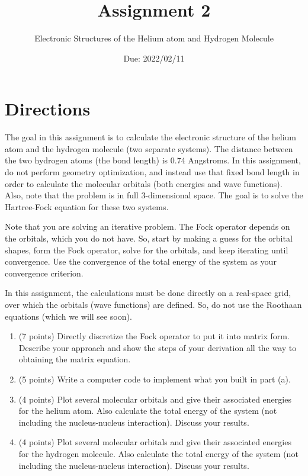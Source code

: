 \documentclass[10pt, oneside, letterpaper]{article}
\title{Assignment 2}
\author{Electronic Structures of the Helium atom and Hydrogen Molecule}
\date{Due: 2022/02/11}
\begin{document}
\maketitle
\thispagestyle{fancy}

\section{Directions}

The goal in this assignment is to calculate the electronic structure of the helium atom and the hydrogen molecule (two separate systems). The distance between the two hydrogen atoms (the bond length) is 0.74 Angstroms. In this assignment, do not perform geometry optimization, and instead use that fixed bond length in order to calculate the molecular orbitals (both energies and wave functions). Also, note that the problem is in full 3-dimensional space. The goal is to solve the Hartree-Fock equation for these two systems.

Note that you are solving an iterative problem. The Fock operator depends on the orbitals, which you do not have. So, start by making a guess for the orbital shapes, form the Fock operator, solve for the orbitals, and keep iterating until convergence. Use the convergence of the total energy of the system as your convergence criterion.

In this assignment, the calculations must be done directly on a real-space grid, over which the orbitals (wave functions) are defined. So, do not use the Roothaan equations (which we will see soon).

\begin{enumerate}[label=(\alph*)]
  \item (7 points) Directly discretize the Fock operator to put it into matrix form. Describe your approach and show the steps of your derivation all the way to obtaining the matrix equation.
  \item (5 points) Write a computer code to implement what you built in part (a).
  \item (4 points) Plot several molecular orbitals and give their associated energies for the helium atom. Also calculate the total energy of the system (not including the nucleus-nucleus interaction). Discuss your results.
  \item (4 points) Plot several molecular orbitals and give their associated energies for the hydrogen molecule. Also calculate the total energy of the system (not including the nucleus-nucleus interaction). Discuss your results.
\end{enumerate}
\end{document}
